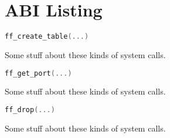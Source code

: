 \chapter{ABI Listing}
\label{abi-listing}

\begin{lstlisting}[language=c++]
ff_create_table(...)
\end{lstlisting}
Some stuff about these kinds of system calls.

\begin{lstlisting}[language=c++]
ff_get_port(...)
\end{lstlisting}
Some stuff about these kinds of system calls.

\begin{lstlisting}[language=c++]
ff_drop(...)
\end{lstlisting}
Some stuff about these kinds of system calls.
